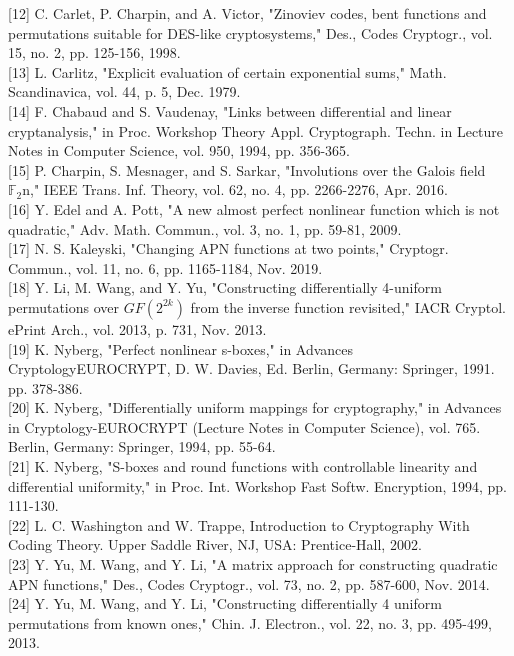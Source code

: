 \documentclass[10pt]{article}
\begin{document}
[12] C. Carlet, P. Charpin, and A. Victor, "Zinoviev codes, bent functions and permutations suitable for DES-like cryptosystems," Des., Codes Cryptogr., vol. 15, no. 2, pp. 125-156, 1998.\\[0pt]
[13] L. Carlitz, "Explicit evaluation of certain exponential sums," Math. Scandinavica, vol. 44, p. 5, Dec. 1979.\\[0pt]
[14] F. Chabaud and S. Vaudenay, "Links between differential and linear cryptanalysis," in Proc. Workshop Theory Appl. Cryptograph. Techn. in Lecture Notes in Computer Science, vol. 950, 1994, pp. 356-365.\\[0pt]
[15] P. Charpin, S. Mesnager, and S. Sarkar, "Involutions over the Galois field $\mathbb{F}_{2} \mathrm{n}$," IEEE Trans. Inf. Theory, vol. 62, no. 4, pp. 2266-2276, Apr. 2016.\\[0pt]
[16] Y. Edel and A. Pott, "A new almost perfect nonlinear function which is not quadratic," Adv. Math. Commun., vol. 3, no. 1, pp. 59-81, 2009.\\[0pt]
[17] N. S. Kaleyski, "Changing APN functions at two points," Cryptogr. Commun., vol. 11, no. 6, pp. 1165-1184, Nov. 2019.\\[0pt]
[18] Y. Li, M. Wang, and Y. Yu, "Constructing differentially 4-uniform permutations over $G F\left(2^{2 k}\right)$ from the inverse function revisited," IACR Cryptol. ePrint Arch., vol. 2013, p. 731, Nov. 2013.\\[0pt]
[19] K. Nyberg, "Perfect nonlinear s-boxes," in Advances CryptologyEUROCRYPT, D. W. Davies, Ed. Berlin, Germany: Springer, 1991. pp. 378-386.\\[0pt]
[20] K. Nyberg, "Differentially uniform mappings for cryptography," in Advances in Cryptology-EUROCRYPT (Lecture Notes in Computer Science), vol. 765. Berlin, Germany: Springer, 1994, pp. 55-64.\\[0pt]
[21] K. Nyberg, "S-boxes and round functions with controllable linearity and differential uniformity," in Proc. Int. Workshop Fast Softw. Encryption, 1994, pp. 111-130.\\[0pt]
[22] L. C. Washington and W. Trappe, Introduction to Cryptography With Coding Theory. Upper Saddle River, NJ, USA: Prentice-Hall, 2002.\\[0pt]
[23] Y. Yu, M. Wang, and Y. Li, "A matrix approach for constructing quadratic APN functions," Des., Codes Cryptogr., vol. 73, no. 2, pp. 587-600, Nov. 2014.\\[0pt]
[24] Y. Yu, M. Wang, and Y. Li, "Constructing differentially 4 uniform permutations from known ones," Chin. J. Electron., vol. 22, no. 3, pp. 495-499, 2013.
\end{document}
